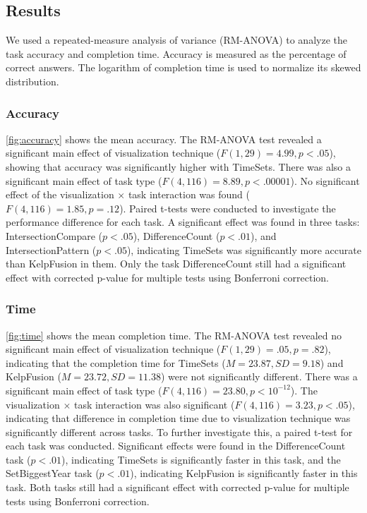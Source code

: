 \subsection{Results}
We used a repeated-measure analysis of variance (RM-ANOVA) to analyze the task accuracy and completion time. Accuracy is measured as the percentage of correct answers. The logarithm of completion time is used to normalize its skewed distribution.

\subsubsection{Accuracy}
\autoref{fig:accuracy} shows the mean accuracy. The RM-ANOVA test revealed a significant main effect of visualization technique ($F(1,29)=4.99, p<.05$), showing that accuracy was significantly higher with TimeSets. There was also a significant main effect of task type ($F(4,116)=8.89, p<.00001$). No significant effect of the visualization $\times$ task interaction was found ($F(4,116)=1.85, p=.12$). Paired t-tests were conducted to investigate the performance difference for each task. A significant effect was found in three tasks: IntersectionCompare ($p<.05$), DifferenceCount ($p<.01$), and IntersectionPattern ($p<.05$), indicating TimeSets was significantly more accurate than KelpFusion in them. Only the task DifferenceCount still had a significant effect with corrected p-value for multiple tests using Bonferroni correction.

\subsubsection{Time}
\autoref{fig:time} shows the mean completion time. The RM-ANOVA test revealed no significant main effect of visualization technique ($F(1,29)=.05, p=.82$), indicating that the completion time for TimeSets ($M=23.87,SD=9.18$) and KelpFusion ($M=23.72,SD=11.38$) were not significantly different. There was a significant main effect of task type ($F(4,116)=23.80, p<10^{-12}$). The visualization $\times$ task interaction was also significant ($F(4,116)=3.23,p<.05$), indicating that difference in completion time due to visualization technique was significantly different across tasks. To further investigate this, a paired t-test for each task was conducted. Significant effects were found in the DifferenceCount task ($p<.01$), indicating TimeSets is significantly faster in this task, and the SetBiggestYear task ($p<.01$), indicating KelpFusion is significantly faster in this task. Both tasks still had a significant effect with corrected p-value for multiple tests using Bonferroni correction.

